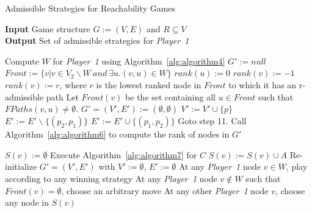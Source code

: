 \begin{algorithm}
	\caption{Admissible Strategies for Reachability Games}
	\textbf{Input} Game structure $G := (V,E)$ and $R \subseteq V$ \\ 
	\textbf{Output} Set of admissible strategies for \textit{Player~1}
	\label{alg:algorithm5}
	\begin{algorithmic}[1]
		\STATE Compute $W$ for \textit{Player~1} using Algorithm~\ref{alg:algorithm4}
		\STATE $G' := null$
		\STATE $\mathit{Front} := \{ v | v \in V_{2} \backslash W \: and  \: \exists u . (v,u) \in W\}$
		\STATE $rank(u) := 0$
		\ENDFOR
		\STATE $rank(v) := -1$
		\ELSE
		\STATE $rank(v) := r$, where $r$ is the lowest ranked node in $\mathit{Front}$ to which it has an r-admissible path
		\ENDIF
		\ENDFOR
		\STATE Let $\mathit{Front}(v)$ be the set containing all $u \in \mathit{Front}$ such that $\mathit{FPaths}(v,u) \neq \emptyset$. 
		\STATE $G' = (V',E') := (\emptyset,\emptyset)$
		\STATE $V' := V' \cup \{p\}$
		\ENDFOR
		\STATE $E' := E' \backslash \{(p_{2},p_{1})\}$
		\ELSE
		\STATE $E' := E' \cup \{(p_{1},p_{2})\}$
		\ENDIF
		\STATE Goto step 11.
		\ENDIF
		\ENDFOR
		\STATE Call Algorithm~\ref{alg:algorithm6} to compute the rank of nodes in $G'$
\end{algorithmic}
\end{algorithm}

\begin{algorithm}
\begin{algorithmic}[1]
		\STATE $S(v) := \emptyset$ 
		\STATE Execute Algorithm~\ref{alg:algorithm7} for $C$
		\STATE $S(v) := S(v) \cup A$
		\ENDFOR
		\STATE Re-initialize $G' = (V',E')$ with $V' := \emptyset$, $E' := \emptyset$
		\ENDIF
		\ENDFOR
		\STATE At any \textit{Player~1} node $v \in W$, play according to any winning strategy
		\STATE At any \textit{Player~1} node $v \notin W$ such that $\mathit{Front}(v) = \emptyset$, choose an arbitrary move
		\STATE At any other \textit{Player~1} node $v$, choose any node in $S(v)$
	\end{algorithmic}
\end{algorithm}

